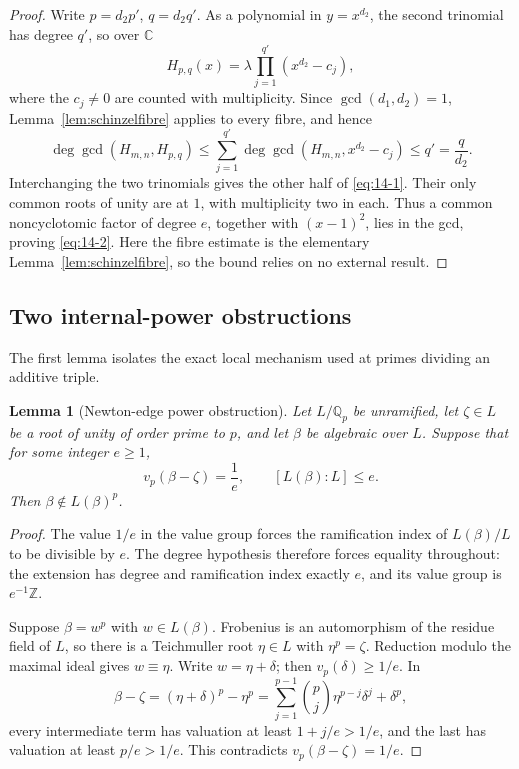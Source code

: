 \documentclass[11pt]{article}
\numberwithin{equation}{section}
\newtheorem{lemma}[theorem]{Lemma}
\theoremstyle{definition}
\newcommand{\Q}{\mathbb Q}
\newcommand{\Z}{\mathbb Z}
\newcommand{\C}{\mathbb C}
\begin{document}
\begin{proof}
Write \(p=d_2p'\), \(q=d_2q'\).  As a polynomial in
\(y=x^{d_2}\), the second trinomial has degree \(q'\), so over \(\C\)
\[
 H_{p,q}(x)=\lambda
 \prod_{j=1}^{q'}(x^{d_2}-c_j),
\]
where the \(c_j\neq0\) are counted with multiplicity.  Since
\(\gcd(d_1,d_2)=1\), Lemma~\ref{lem:schinzelfibre} applies to every fibre,
and hence
\[
 \deg\gcd(H_{m,n},H_{p,q})
 \leq\sum_{j=1}^{q'}
 \deg\gcd(H_{m,n},x^{d_2}-c_j)
 \leq q'=\frac q{d_2}.
\]
Interchanging the two trinomials gives the other half of \eqref{eq:14-1}.  Their
only common roots of unity are at \(1\), with multiplicity two in each.
Thus a common noncyclotomic factor of degree \(e\), together with
\((x-1)^2\), lies in the gcd, proving \eqref{eq:14-2}.  Here the fibre estimate is
the elementary Lemma~\ref{lem:schinzelfibre}, so the bound relies on no
external result.
\end{proof}

\subsection{Two internal-power obstructions}

The first lemma isolates the exact local mechanism used at primes dividing an
additive triple.

\begin{lemma}[Newton-edge power obstruction]\label{lem:edgepower}
Let \(L/\Q_p\) be unramified, let \(\zeta\in L\) be a root of unity of
order prime to \(p\), and let \(\beta\) be algebraic over \(L\).  Suppose
that for some integer \(e\geq1\),
\[
 v_p(\beta-\zeta)=\frac1e,
 \qquad [L(\beta):L]\leq e.
\]
Then \(\beta\notin L(\beta)^p\).
\end{lemma}

\begin{proof}
The value \(1/e\) in the value group forces the ramification index of
\(L(\beta)/L\) to be divisible by \(e\).  The degree hypothesis therefore
forces equality throughout: the extension has degree and ramification index
exactly \(e\), and its value group is \(e^{-1}\Z\).

Suppose \(\beta=w^p\) with \(w\in L(\beta)\).  Frobenius is an automorphism
of the residue field of \(L\), so there is a Teichmuller root
\(\eta\in L\) with \(\eta^p=\zeta\).  Reduction modulo the maximal ideal
gives \(w\equiv\eta\).  Write \(w=\eta+\delta\); then
\(v_p(\delta)\geq1/e\).  In
\[
 \beta-\zeta=(\eta+\delta)^p-\eta^p
 =\sum_{j=1}^{p-1}\binom pj\eta^{p-j}\delta^j+\delta^p,
\]
every intermediate term has valuation at least \(1+j/e>1/e\), and the last
has valuation at least \(p/e>1/e\).  This contradicts
\(v_p(\beta-\zeta)=1/e\).
\end{proof}
\end{document}
